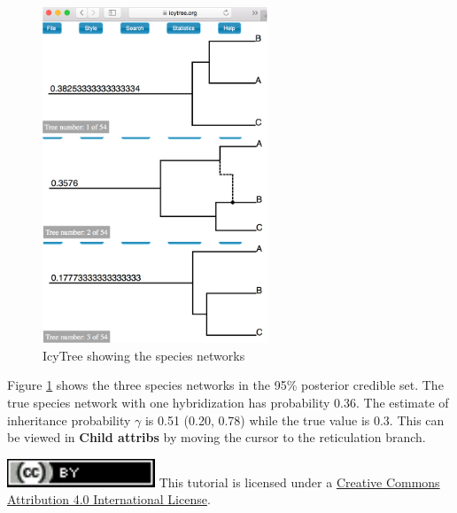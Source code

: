 \documentclass[11pt]{article}
\begin{document}
\begin{figure}[h]
\center
\includegraphics[width=0.6\textwidth]{figs/fig12_networks}
\caption{IcyTree showing the species networks}
\label{fig_networks}
\end{figure}

Figure \ref{fig_networks} shows the three species networks in the 95\% posterior credible set. The true species network with one hybridization has probability 0.36. The estimate of inheritance probability $\gamma$ is 0.51 (0.20, 0.78) while the true value is 0.3. This can be viewed in \textbf{Child attribs} by moving the cursor to the reticulation branch.

\bigskip
\noindent \href{http://creativecommons.org/licenses/by/4.0/}{\includegraphics[scale=0.7]{figs/fig_ccby.pdf}} This tutorial is licensed under a \href{http://creativecommons.org/licenses/by/4.0/}{Creative Commons Attribution 4.0 International License}. 



\end{document}
